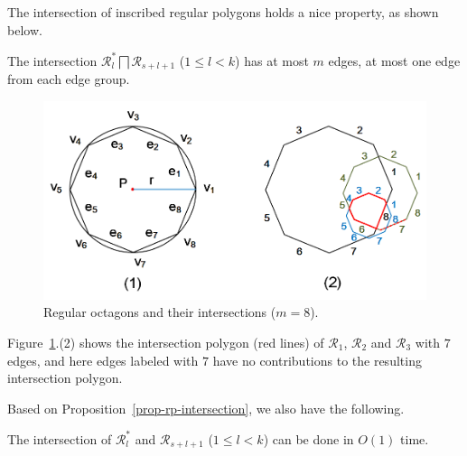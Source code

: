 The intersection of inscribed regular polygons holds a nice property, as shown below.

\begin{prop}
\label{prop-rp-intersection}
The intersection $\mathcal{R}^*_{l} \bigsqcap \mathcal{R}_{s+l+1}$ ($ 1\le l< k$) has at most $m$ edges, \ie at most one edge from each edge group.
\end{prop}








\begin{figure}[tb!]
	\centering
	\includegraphics[scale=0.85]{figures/Fig-polygons.png}
	\vspace{0ex}
	\caption{\small Regular octagons and their intersections ($m =8$).}
	\vspace{-1ex}
	\label{fig:polygons}
\end{figure}

Figure~\ref{fig:polygons}.(2) shows the intersection polygon (red lines) of $\mathcal{R}_1$, $\mathcal{R}_2$ and $\mathcal{R}_3$ with $7$ edges, and here edges labeled with $7$ have no contributions to the resulting intersection polygon.

Based on Proposition~\ref{prop-rp-intersection}, we also have the following.

\begin{prop}
\label{prop-cpi-time}
The intersection of $\mathcal{R}^*_l$ and $\mathcal{R}_{s+l+1}$ ($ 1\le l< k$) can be done in $O(1)$
time.
\end{prop}


